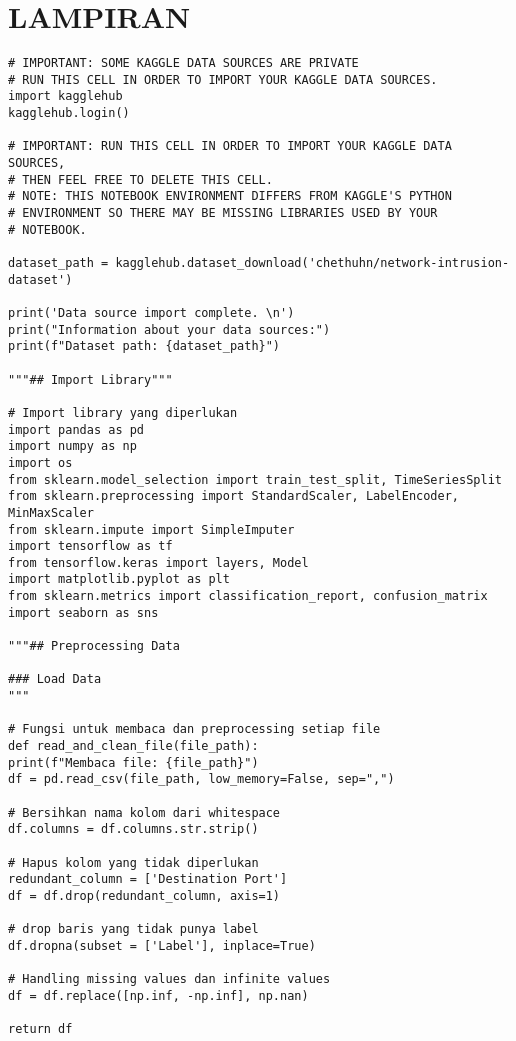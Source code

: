 \documentclass[a4paper,12pt]{report}
\begin{document}
\newpage
{}
\chapter*{LAMPIRAN}
	\begin{lstlisting}
# IMPORTANT: SOME KAGGLE DATA SOURCES ARE PRIVATE
# RUN THIS CELL IN ORDER TO IMPORT YOUR KAGGLE DATA SOURCES.
import kagglehub
kagglehub.login()

# IMPORTANT: RUN THIS CELL IN ORDER TO IMPORT YOUR KAGGLE DATA SOURCES,
# THEN FEEL FREE TO DELETE THIS CELL.
# NOTE: THIS NOTEBOOK ENVIRONMENT DIFFERS FROM KAGGLE'S PYTHON
# ENVIRONMENT SO THERE MAY BE MISSING LIBRARIES USED BY YOUR
# NOTEBOOK.

dataset_path = kagglehub.dataset_download('chethuhn/network-intrusion-dataset')

print('Data source import complete. \n')
print("Information about your data sources:")
print(f"Dataset path: {dataset_path}")

"""## Import Library"""

# Import library yang diperlukan
import pandas as pd
import numpy as np
import os
from sklearn.model_selection import train_test_split, TimeSeriesSplit
from sklearn.preprocessing import StandardScaler, LabelEncoder, MinMaxScaler
from sklearn.impute import SimpleImputer
import tensorflow as tf
from tensorflow.keras import layers, Model
import matplotlib.pyplot as plt
from sklearn.metrics import classification_report, confusion_matrix
import seaborn as sns

"""## Preprocessing Data

### Load Data
"""

# Fungsi untuk membaca dan preprocessing setiap file
def read_and_clean_file(file_path):
print(f"Membaca file: {file_path}")
df = pd.read_csv(file_path, low_memory=False, sep=",")

# Bersihkan nama kolom dari whitespace
df.columns = df.columns.str.strip()

# Hapus kolom yang tidak diperlukan
redundant_column = ['Destination Port']
df = df.drop(redundant_column, axis=1)

# drop baris yang tidak punya label
df.dropna(subset = ['Label'], inplace=True)

# Handling missing values dan infinite values
df = df.replace([np.inf, -np.inf], np.nan)

return df



\end{lstlisting}
\end{document}
